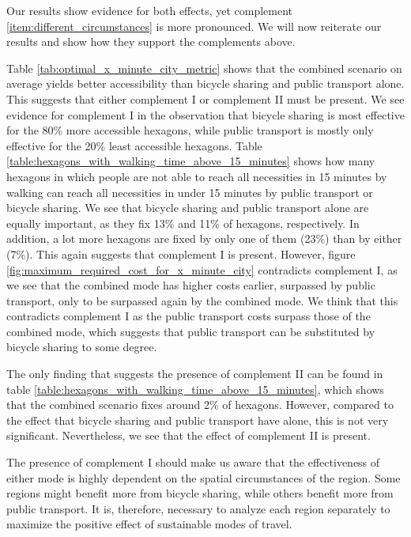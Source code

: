 Our results show evidence for both effects, yet complement \ref{item:different_circumstances} is more pronounced.
We will now reiterate our results and show how they support the complements above.

Table \ref{tab:optimal_x_minute_city_metric} shows that the combined scenario on average yields better accessibility than bicycle sharing and public transport alone.
This suggests that either complement I or complement II must be present.
We see evidence for complement I in the observation that bicycle sharing is most effective for the 80\% more accessible hexagons, while public transport is mostly only effective for the 20\% least accessible hexagons.
Table \ref{table:hexagons_with_walking_time_above_15_minutes} shows how many hexagons in which people are not able to reach all necessities in 15 minutes by walking can reach all necessities in under 15 minutes by public transport or bicycle sharing.
We see that bicycle sharing and public transport alone are equally important, as they fix 13\% and 11\% of hexagons, respectively.
In addition, a lot more hexagons are fixed by only one of them (23\%) than by either (7\%).
This again suggests that complement I is present.
However, figure \ref{fig:maximum_required_cost_for_x_minute_city} contradicts complement I, as we see that the combined mode has higher costs earlier, surpassed by public transport, only to be surpassed again by the combined mode.
We think that this contradicts complement I as the public transport costs surpass those of the combined mode, which suggests that public transport can be substituted by bicycle sharing to some degree.


The only finding that suggests the presence of complement II can be found in table \ref{table:hexagons_with_walking_time_above_15_minutes}, which shows that the combined scenario fixes around 2\% of hexagons.
However, compared to the effect that bicycle sharing and public transport have alone, this is not very significant.
Nevertheless, we see that the effect of complement II is present.


The presence of complement I should make us aware that the effectiveness of either mode is highly dependent on the spatial circumstances of the region.
Some regions might benefit more from bicycle sharing, while others benefit more from public transport.
It is, therefore, necessary to analyze each region separately to maximize the positive effect of sustainable modes of travel.

